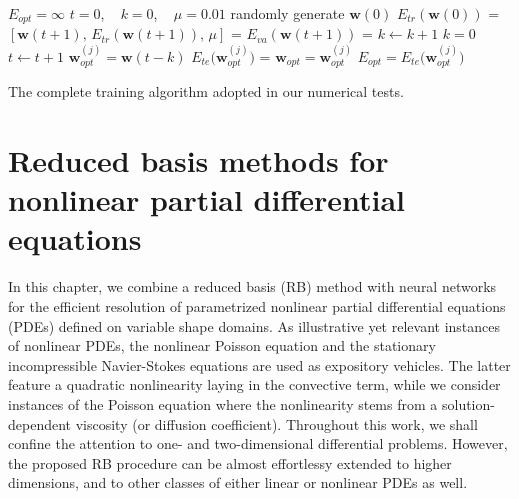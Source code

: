 \documentclass[12pt, a4paper, twoside, openright]{report}
\numberwithin{equation}{chapter}
\theoremstyle{theorem}
\theoremstyle{definition}
\theoremstyle{remark}
\theoremstyle{proposition}
\numberwithin{figure}{chapter}
\begin{document}
		\begin{algorithm}[H]	
			\begin{algorithmic}[1]
					\State $E_{opt} = \infty$
						\State $t = 0$, ~ $k = 0$, ~ $\mu = 0.01$
						\State randomly generate $\mathbf{w}(0)$
						\State $E_{tr}(\mathbf{w}(0))$ = 
							\State $\left[ \mathbf{w}(t+1), \, E_{tr}(\mathbf{w}(t+1)), \, \mu \right]$ = 
							\State $E_{va}(\mathbf{w}(t+1))$ = 
								\State $k \leftarrow k + 1$
							\Else
								\State $k = 0$
							\EndIf
							\State $t \leftarrow t+1$					
						\EndWhile		
						\State $\mathbf{w}_{opt}^{(j)} = \mathbf{w}(t-k)$
						\State $E_{te} \big( \mathbf{w}_{opt}^{(j)} \big)$ = 
							\State $\mathbf{w}_{opt} = \mathbf{w}_{opt}^{(j)}$
							\State $E_{opt} = E_{te} \big( \mathbf{w}_{opt}^{(j)} \big)$
						\EndIf
					\EndFor
				\EndFunction
				
			\end{algorithmic}
			
			\caption{The complete training algorithm adopted in our numerical tests.}
			\label{alg:offline-learning-complete}
		\end{algorithm}
		
		

	\chapter{Reduced basis methods for nonlinear partial differential equations}
	\label{chapter:Reduced Basis method for nonlinear partial differential equations}
			
		In this chapter, we combine a reduced basis (RB) method with neural networks for the efficient resolution of parametrized nonlinear partial differential equations (PDEs) defined on variable shape domains. As illustrative yet relevant instances of nonlinear PDEs, the nonlinear Poisson equation and the stationary incompressible Navier-Stokes equations are used as expository vehicles. The latter feature a quadratic nonlinearity laying in the convective term, while we consider instances of the Poisson equation where the nonlinearity stems from a solution-dependent viscosity (or diffusion coefficient). Throughout this work, we shall confine the attention to one- and two-dimensional differential problems. However, the proposed RB procedure can be almost effortlessy extended to higher dimensions, and to other classes of either linear or nonlinear PDEs as well.
		
\end{document}
